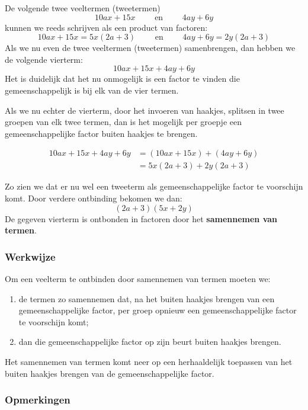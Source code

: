 \documentclass{bis}
\begin{document}
De volgende twee veeltermen (tweetermen)
\[10ax + 15x	\qquad\text{ en }\qquad	4ay + 6y\]
kunnen we reeds schrijven als een product van factoren:
\[10ax + 15x = 5x (2a + 3)	\qquad\text{ en }\qquad 4ay + 6y = 2y (2a + 3)\]
Als we nu even de twee veeltermen (tweetermen) samenbrengen, dan hebben we de volgende vierterm:
\[10ax + 15x + 4ay + 6y\]
Het is duidelijk dat het nu onmogelijk is een factor te vinden die gemeenschappelijk is bij elk van de vier termen.

Als we nu echter de vierterm, door het invoeren van haakjes, splitsen in twee groepen van elk twee termen, dan is het mogelijk per groepje een gemeenschappelijke factor buiten haakjes te brengen.

\begin{align*}
10ax + 15x + 4ay + 6y	&= (10ax + 15x) + (4ay + 6y)\\
                      &= 5x (2a + 3) + 2y (2a + 3)
\end{align*}

Zo zien we dat er nu wel een tweeterm als gemeenschappelijke factor te voorschijn komt.
Door verdere ontbinding bekomen we dan:
\[(2a + 3) (5x + 2y)\]
De gegeven vierterm is ontbonden in factoren door het {\bf samennemen van termen}.

\subsubsection*{Werkwijze}

Om een veelterm te ontbinden door samennemen van termen moeten we:
\begin{enumerate}[label=\arabic*.]
  \item de termen zo samennemen dat, na het buiten haakjes brengen van een gemeenschappelijke factor, per groep opnieuw een gemeenschappelijke factor te voorschijn komt;
  \item dan die gemeenschappelijke factor op zijn beurt buiten haakjes brengen.
\end{enumerate}

Het samennemen van termen komt neer op een herhaaldelijk toepassen van het buiten haakjes brengen van de gemeenschappelijke factor.

\subsubsection*{Opmerkingen}
\end{document}
